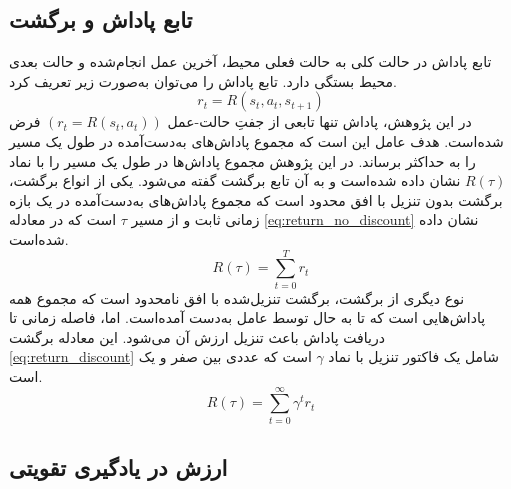  
\subsection{تابع پاداش و برگشت}
تابع پاداش در حالت کلی به حالت فعلی محیط، آخرین عمل انجام‌شده و حالت بعدی محیط بستگی دارد. تابع پاداش را می‌توان به‌صورت زیر تعریف کرد.
\begin{equation}
	r_t = R(s_t, a_t, s_{t+1})
\end{equation}
در این پژوهش، پاداش تنها تابعی از جفتِ حالت-عمل \((r_t = R(s_t, a_t))\) فرض شده‌است.
هدف عامل این است که مجموع پاداش‌های به‌دست‌آمده در طول یک مسیر را به حداکثر برساند. در این پژوهش مجموع پاداش‌ها در طول یک مسیر را با نماد \(R(\tau)\) نشان داده‌ شده‌است و به آن تابع برگشت
 گفته می‌شود.
یکی از انواع برگشت، برگشت بدون تنزیل با افق محدود
 است که مجموع پاداش‌های به‌دست‌آمده در یک بازه زمانی ثابت و از مسیر
 \(\tau\)
  است که در معادله 
  \eqref{eq:return_no_discount}
  نشان داده شده‌است.
 \begin{equation}
 	R(\tau) = \sum_{t = 0}^T r_t
 	\label{eq:return_no_discount}
 \end{equation}
نوع دیگری از برگشت، برگشت تنزیل‌شده با افق نامحدود
 است که مجموع همه پاداش‌هایی است که تا به حال توسط عامل به‌دست آمده‌است. اما، فاصله زمانی تا دریافت پاداش باعث تنزیل ارزش آن می‌شود. این معادله برگشت \eqref{eq:return_discount} شامل یک فاکتور تنزیل
   با نماد \(\gamma\) است که
   عددی بین صفر و یک است.
    \begin{equation}
   	R(\tau) = \sum_{t = 0}^{\infty} \gamma^t r_t
   	\label{eq:return_discount}
   \end{equation}
   
   
   
 \subsection{ ارزش در یادگیری تقویتی}
   
